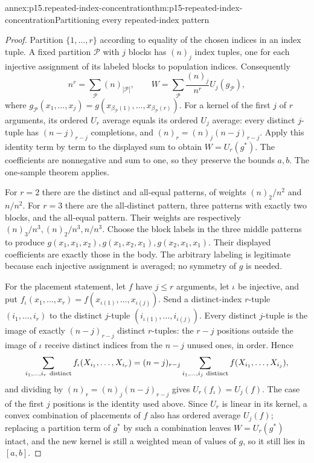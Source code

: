 \begin{annexitem}{annex:p15.repeated-index-concentration}{thm:p15-repeated-index-concentration}{Partitioning every repeated-index pattern}
\begin{proof}
Partition \(\{1,\ldots,r\}\) according to equality of the chosen indices
in an index tuple. A fixed partition \(\mathcal P\) with \(j\) blocks
has \((n)_j\) index tuples, one for each injective assignment of its
labeled blocks to population indices. Consequently
\[
 n^r=\sum_{\mathcal P}(n)_{|\mathcal P|},\qquad
 W=\sum_{\mathcal P}\frac{(n)_j}{n^r}U_j(g_{\mathcal P}),
\]
where
\(g_{\mathcal P}(x_1,\ldots,x_j)
 =g(x_{\beta_{\mathcal P}(1)},\ldots,x_{\beta_{\mathcal P}(r)})\).
For a kernel of the first \(j\) of \(r\) arguments, its ordered
\(U_r\) average equals its ordered \(U_j\) average: every distinct
\(j\)-tuple has \((n-j)_{r-j}\) completions, and
\((n)_r=(n)_j(n-j)_{r-j}\).
Apply this identity term by term to the displayed sum to obtain
\(W=U_r(g^*)\). The coefficients are nonnegative and sum to one,
so they preserve the bounds \(a,b\). The one-sample theorem applies.

For \(r=2\) there are the distinct and all-equal patterns, of weights
\((n)_2/n^2\) and \(n/n^2\). For \(r=3\) there are the all-distinct
pattern, three patterns with exactly two blocks, and the all-equal
pattern. Their weights are respectively
\((n)_3/n^3,(n)_2/n^3,n/n^3\).
Choose the block labels in the three middle patterns to produce
\(g(x_1,x_1,x_2),g(x_1,x_2,x_1),g(x_2,x_1,x_1)\).
Their displayed coefficients are exactly those in the body.
The arbitrary labeling is legitimate because each injective assignment
is averaged; no symmetry of \(g\) is needed.

For the placement statement, let \(f\) have \(j\leq r\) arguments, let
\(\iota\) be injective, and put
\(f_\iota(x_1,\ldots,x_r)=f(x_{\iota(1)},\ldots,x_{\iota(j)})\).
Send a distinct-index \(r\)-tuple \((i_1,\ldots,i_r)\) to the distinct
\(j\)-tuple \((i_{\iota(1)},\ldots,i_{\iota(j)})\). Every distinct
\(j\)-tuple is the image of exactly \((n-j)_{r-j}\) distinct \(r\)-tuples:
the \(r-j\) positions outside the image of \(\iota\) receive distinct
indices from the \(n-j\) unused ones, in order. Hence
\[
 \sum_{i_1,\ldots,i_r\ {\rm distinct}}f_\iota(X_{i_1},\ldots,X_{i_r})
 =(n-j)_{r-j}\sum_{i_1,\ldots,i_j\ {\rm distinct}}
 f(X_{i_1},\ldots,X_{i_j}),
\]
and dividing by \((n)_r=(n)_j(n-j)_{r-j}\) gives
\(U_r(f_\iota)=U_j(f)\). The case of the first \(j\) positions is the
identity used above. Since \(U_r\) is linear in its kernel, a convex
combination of placements of \(f\) also has ordered average \(U_j(f)\);
replacing a partition term of \(g^*\) by such a combination leaves
\(W=U_r(g^*)\) intact, and the new kernel is still a weighted mean of
values of \(g\), so it still lies in \([a,b]\).


\end{proof}
\end{annexitem}
